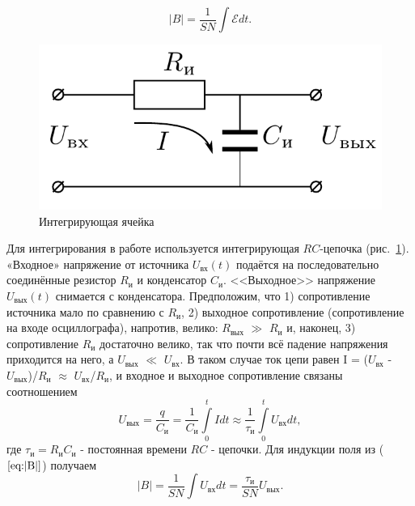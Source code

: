 \documentclass[a4paper, 12pt]{article}
\begin{document}
\begin{equation}
|B|=\frac{1}{SN}\int\mathcal{E} dt.
\label{eq:|B|}
\end{equation}
\begin{figure}
	\includegraphics[width=\linewidth]{2.png}
	\caption{Интегрирующая ячейка}
	\label{fig:int}
\end{figure}

Для интегрирования в работе используется интегрирующая $ RC $-цепочка (рис.~\ref{fig:int}).
«Входное» напряжение от источника $U_{\text{вх}}(t)$ подаётся на последовательно соединённые резистор $R_\text{и}$ и конденсатор $C_\text{и}$. <<Выходное>>
напряжение $U_{\text{вых}}(t)$ снимается с конденсатора. Предположим, что 1) сопротивление источника мало по сравнению с $R_\text{и}$, 2) выходное сопротивление (сопротивление на входе осциллографа), напротив, велико: $R_{\text{вых}}$ $ \gg $ $R_\text{и}$ и, наконец, 3) сопротивление $R_\text{и}$ достаточно велико, так что почти всё падение напряжения приходится на него, а $U_{\text{вых}}$ $\ll$ $U_{\text{вх}}$. В таком случае ток цепи равен I = ($U_{\text{вх}}$ - $U_{\text{вых}}$)/$R_\text{и}$ $\approx$ $U_{\text{вх}}$/$R_\text{и}$, и входное и выходное сопротивление связаны соотношением
\begin{equation}
U_{\text{вых}} = \frac{q}{C_\text{и}} = \frac{1}{C_\text{и}}\int\limits_0^t Idt \approx \frac{1}{\tau_\text{и}} \int\limits_0^t U_{\text{вх}}dt,
\label{eq:U_ext}
\end{equation}
где $\tau_\text{и}=R_\text{и}C_\text{и}$ - постоянная времени $ RC $ - цепочки. Для индукции поля из ($\ref{eq:|B|}$) получаем 
\begin{equation}
|B|=\frac{1}{SN}\int U_{\text{вх}} dt=\frac{\tau_\text{и}}{SN}U_{\text{вых}}.
\label{eq:|B|new}
\end{equation}
\end{document}
